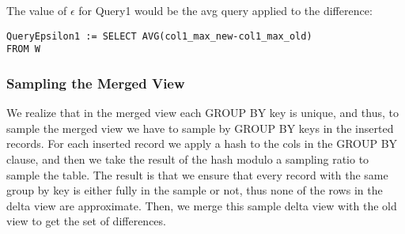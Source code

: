 The value of $\epsilon$ for Query1 would be the avg query applied
to the difference:

\begin{lstlisting}
QueryEpsilon1 := SELECT AVG(col1_max_new-col1_max_old) 
FROM W
\end{lstlisting}



\subsubsection{Sampling the Merged View}

We realize that in the merged view each GROUP BY key is unique, and
thus, to sample the merged view we have to sample by GROUP BY keys
in the inserted records. For each inserted record we apply a hash
to the cols in the GROUP BY clause, and then we take the result of
the hash modulo a sampling ratio to sample the table. The result is
that we ensure that every record with the same group by key is either
fully in the sample or not, thus none of the rows in the delta view
are approximate. Then, we merge this sample delta view with the old
view to get the set of differences.